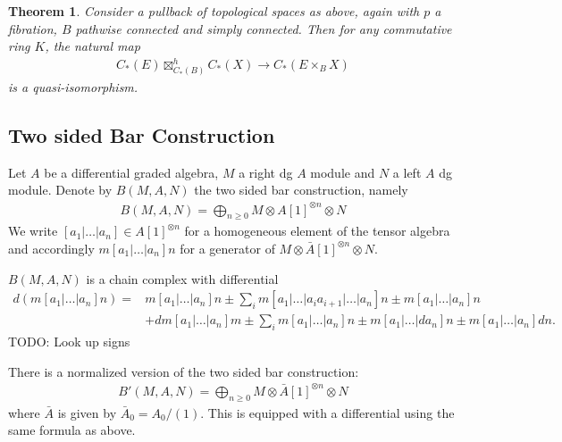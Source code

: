 \documentclass{scrartcl}
\theoremstyle{plain}
\newtheorem{theorem}{Theorem}[section]
\theoremstyle{definition}
\begin{document}
\begin{theorem}
    Consider a pullback of topological spaces as above, again with $p$ a fibration, $B$ pathwise connected and simply connected. Then for any commutative ring $K$, the natural map
    \begin{align*}
        C_*(E)\boxtimes_{C_*(B)}^h C_*(X) \to C_*(E\times_B X)
    \end{align*}
    is a quasi-isomorphism.
\end{theorem}


\subsection{Two sided Bar Construction}\label{subseq:bar_construction}
Let $A$ be a differential graded algebra, $M$ a right dg $A$ module and $N$ a left $A$ dg module. Denote by $B(M, A, N)$ the two sided bar construction, namely 
\begin{align*}
    B(M, A, N) = \bigoplus_{n\geq 0} M\otimes A[1]^{\otimes n} \otimes N
\end{align*}
We write $[a_1|\dots|a_n]\in A[1]^{\otimes n}$ for a homogeneous element of the tensor algebra and accordingly $m[a_1|\dots|a_n]n$ for a generator of $M\otimes \bar A[1]^{\otimes n}\otimes N$.


$B(M, A, N)$ is a chain complex with differential 
\begin{align*}d(m[a_1|\dots|a_n]n) =& m [a_1|\dots|a_n]n \pm \sum_i m[a_1|\dots|a_i a_{i+1}| \dots|a_n]n \pm m[a_1|\dots|a_n] n\\& + dm[a_1|\dots|a_n]m \pm \sum_i m[a_1|\dots|a_n]n \pm m[a_1|\dots|d a_n]n \pm m[a_1|\dots|a_n]dn.
\end{align*}
TODO: Look up signs


There is a normalized version of the two sided bar construction:
\begin{align*}
    B'(M, A, N) = \bigoplus_{n\geq 0} M\otimes \bar A[1]^{\otimes n}\otimes N
\end{align*}
where $\bar A$ is given by $\bar A_0 = A_0/(1)$. This is equipped with a differential using the same formula as above.
\end{document}
